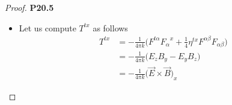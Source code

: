 \documentclass[11pt]{article}
\theoremstyle{definition}
\begin{document}
\begin{proof}{\textbf{P20.5}}
\begin{itemize}
\begin{align*}
\end{align*}
\begin{align*}
    F^{y\alpha}{F_{\alpha}}^{t} &= E_xB_z - E_zB_x = F^{t\alpha}{F_{\alpha}}^{y}\\
    F^{y\alpha}{F_{\alpha}}^{x} &= E_yE_x + B_xB_z = F^{x\alpha}{F_{\alpha}}^{y}\\
    F^{y\alpha}{F_{\alpha}}^{y} &= E_y^2 - B_z^2 - B_x^2\\
    F^{y\alpha}{F_{\alpha}}^{z} &= E_yE_z + B_yB_z
\end{align*}
\begin{align*}
    F^{z\alpha}{F_{\alpha}}^{t} &= -E_xB_y + E_yB_x = F^{t\alpha}{F_{\alpha}}^{z}\\
    F^{z\alpha}{F_{\alpha}}^{x} &= E_xE_z + B_xB_z = F^{x\alpha}{F_{\alpha}}^{z}\\
    F^{z\alpha}{F_{\alpha}}^{y} &= E_yE_z + B_yB_z = F^{y\alpha}{F_{\alpha}}^{z}\\
    F^{z\alpha}{F_{\alpha}}^{z} &= E_z^2 - B_y^2 - B_x^2
\end{align*}
Therefore since $F^{\mu\alpha}F^{\nu}_{\alpha}$ is symmetric then $T^{\mu\nu}$
is symmetric.
\item [\textbf{b.}] Let us compute $T^{tx}$ as follows
\begin{align*}
    T^{tx} &= - \frac{1}{4\pi k} \bigg(
        F^{t\alpha}{F_{\alpha}}^{x}
        + \frac{1}{4}\eta^{tx}F^{\alpha\beta}F_{\alpha\beta}
    \bigg)\\
    &= - \frac{1}{4\pi k} \bigg(E_zB_y - E_yB_z\bigg)\\
    &= - \frac{1}{4\pi k} \bigg(\vec{E} \times \vec{B}\bigg)_x
\end{align*} 
\end{itemize}
\end{proof}
\end{document}
